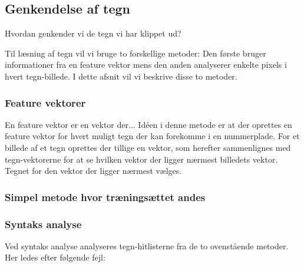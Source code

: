 \subsection{Genkendelse af tegn}
Hvordan genkender vi de tegn vi har klippet ud?
\label{sec_monster}

\begin{comment}
Noter fra møde med Søren 20/2:
Opret feature vektor $f$ for hvert bogstav $\omega$
Finde middelværdivektor for hvert $\omega$.
Afstandsfunktion: den afstand til en middelværdivektor der er mindst, vælges. Dvs. det bogstav vælges.
Featurevektorafstand udregnes hver gang

Euklidisk afstand
En-eller-anden mahap afstand
\end{comment}


Til læsning af tegn vil vi bruge to forskellige metoder: Den første bruger informationer fra en feature vektor mens den anden analyserer enkelte pixels i hvert tegn-billede. I dette afsnit vil vi beskrive disse to metoder.

\subsubsection{Feature vektorer}
En feature vektor er en vektor der... Idéen i denne metode er at der oprettes en feature vektor for hvert muligt tegn der kan forekomme i en nummerplade. For et billede af et tegn oprettes der tillige en vektor, som herefter sammenlignes med tegn-vektorerne for at se hvilken vektor der ligger nærmest billedets vektor. Tegnet for den vektor der ligger nærmest vælges.



\subsubsection{Simpel metode hvor træningsættet andes}

\subsubsection{Syntaks analyse}

Ved syntaks analyse analyseres tegn-hitlisterne fra de to ovenstående metoder. Her ledes efter følgende fejl:

